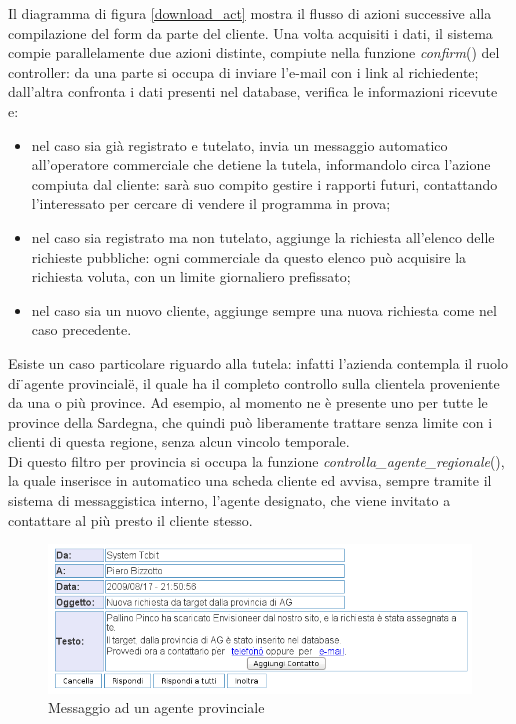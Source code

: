 \noindent
Il diagramma di figura \ref{download_act} mostra il flusso di azioni successive alla compilazione del form da parte del cliente. Una volta acquisiti i dati, il sistema compie parallelamente due azioni distinte, compiute nella funzione \textit{confirm}() del controller: da una parte si occupa di inviare l'e-mail con i link al richiedente; dall'altra confronta i dati presenti nel database, verifica le informazioni ricevute e:

\begin{itemize}
 \item nel caso sia gi\`a registrato e tutelato, invia un messaggio automatico all'operatore commerciale che detiene la tutela, informandolo circa l'azione compiuta dal cliente: sar\`a suo compito gestire i rapporti futuri, contattando l'interessato per cercare di vendere il programma in prova;
 \item nel caso sia registrato ma non tutelato, aggiunge la richiesta all'elenco delle richieste pubbliche: ogni commerciale da questo elenco pu\`o acquisire la richiesta voluta, con un limite giornaliero prefissato;
 \item nel caso sia un nuovo cliente, aggiunge sempre una nuova richiesta come nel caso precedente.
\end{itemize}
\noindent
Esiste un caso particolare riguardo alla tutela: infatti l'azienda contempla il ruolo di \"{}agente provinciale\"{}, il quale ha il completo controllo sulla clientela proveniente da una o pi\`u province. Ad esempio, al momento ne \`e presente uno per tutte le province della Sardegna, che quindi pu\`o liberamente trattare senza limite con i clienti di questa regione, senza alcun vincolo temporale.\\
Di questo filtro per provincia si occupa la funzione \textit{controlla\_{}agente\_{}regionale}(), la quale inserisce in automatico una scheda cliente ed avvisa, sempre tramite il sistema di messaggistica interno, l'agente designato, che viene invitato a contattare al pi\`u presto il cliente stesso.

\begin{figure}[!ht]
\centering
  \includegraphics[scale=0.6]{./images/messaggioAgenteScreen.png}
\caption{Messaggio ad un agente provinciale}
\label{agent_message}
\end{figure}

